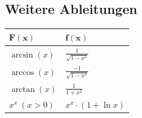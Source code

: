 \subsection{Weitere Ableitungen}
\begin{center}
	\begin{tabularx}{\linewidth}{>{\centering\arraybackslash}X>{\centering\arraybackslash}X}
		\toprule
		$\mathbf{F(x)}$ & $\mathbf{f(x)}$             \\
		\midrule
		$\arcsin(x)$    & $\frac{1}{\sqrt{1 - x^2}}$  \\
		$\arccos(x)$    & $\frac{-1}{\sqrt{1 - x^2}}$ \\
		$\arctan(x)$    & $\frac{1}{1 + x^2}$         \\
		$x^x \ (x > 0)$ & $x^x \cdot (1 + \ln x)$     \\
		\bottomrule
	\end{tabularx}
\end{center}
